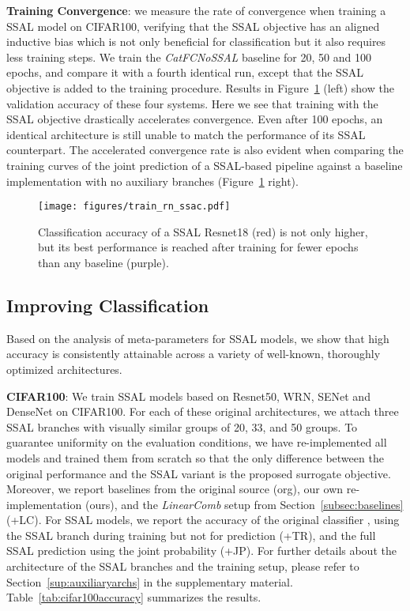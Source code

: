 \documentclass[10pt,twocolumn,letterpaper]{article}
\begin{document}
\textbf{Training Convergence}: we measure the rate of convergence when training a SSAL model on CIFAR100, verifying that the SSAL objective has an aligned inductive bias which is not only beneficial for classification but it also requires less training steps.
We train the \emph{CatFCNoSSAL} baseline for 20, 50 and 100 epochs, and compare it with a fourth identical run, except that the SSAL objective is added to the training procedure.
Results in Figure~\ref{fig:convergence} (left) show the validation accuracy of these four systems.
Here we see that training with the SSAL objective drastically accelerates convergence.
Even after 100 epochs, an identical architecture is still unable to match the performance of its SSAL counterpart.
The accelerated convergence rate is also evident when comparing the training curves of the joint prediction of a SSAL-based pipeline against a baseline implementation with no auxiliary branches (Figure~\ref{fig:convergence} right).

\begin{figure}[t]
\centering
    \texttt{[image: figures/train\_rn\_ssac.pdf]}
	\caption{Classification accuracy of a SSAL Resnet18 (red) is not only higher, but its best performance is reached after training for fewer epochs than any baseline (purple).}
	\label{fig:convergence}
\end{figure}


\subsection{Improving Classification}
\label{sec:classification}
Based on the analysis of meta-parameters for SSAL models, we show that high accuracy is consistently attainable across a variety of well-known, thoroughly optimized architectures.

\textbf{CIFAR100}: We train SSAL models based on Resnet50, WRN, SENet and DenseNet on CIFAR100.
For each of these original architectures, we attach three SSAL branches with visually similar groups of 20, 33, and 50 groups.
To guarantee uniformity on the evaluation conditions, we have re-implemented all models and trained them from scratch so that the only difference between the original performance and the SSAL variant is the proposed surrogate objective.
Moreover, we report baselines from the original source (org), our own re-implementation (ours), and the \textit{LinearComb} setup from Section~\ref{subsec:baselines} (+LC).
For SSAL models, we report the accuracy of the original classifier \ie, using the SSAL branch during training but not for prediction (+TR), and the full SSAL prediction using the joint probability (+JP).
For further details about the architecture of the SSAL branches and the training setup, please refer to Section~\ref{sup:auxiliaryarchs} in the supplementary material.
Table~\ref{tab:cifar100accuracy} summarizes the results.
\end{document}
